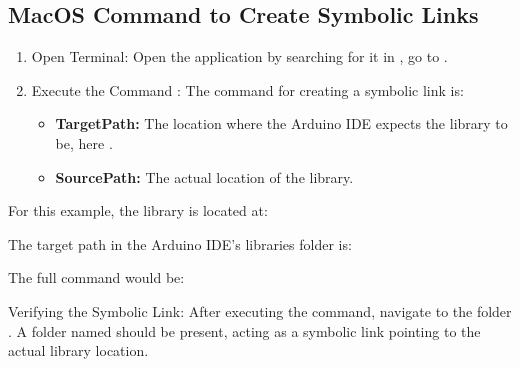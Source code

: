 {\subsection{MacOS Command  to Create Symbolic Links}


\begin{enumerate}
	
	\item Open Terminal: Open the  application by searching for it in , go to .
	
	\item Execute the Command  : The command for creating a symbolic link is: 
	
	
	
	
	
	\begin{itemize}
		\item 	\textbf{TargetPath:} The location where the Arduino IDE expects the library to be, here .
		\item 	\textbf{SourcePath:} The actual location of the library.
	\end{itemize}
	
\end{enumerate}
		
		
		
\bigskip

		
For this example, the library is located at: 


{\small{}}

\medskip



The target path in the Arduino IDE’s libraries folder is: 


{\small{}}

\medskip

The full command would be: 

{\small{}}


\medskip


Verifying the Symbolic Link: After executing the command, navigate to the folder . A folder named  should be present, acting as a symbolic link pointing to the actual library location.

}
